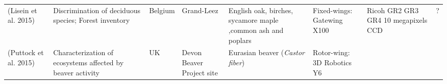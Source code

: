 \documentclass[]{interact}
\theoremstyle{plain}%
\theoremstyle{definition}
\theoremstyle{remark}
\begin{document}
\begin{longtable}[]{@{}llllllll@{}}
\begin{minipage}[t]{0.11\columnwidth}
(Lisein et al. 2015)\strut
\end{minipage} & \begin{minipage}[t]{0.18\columnwidth}\raggedright\strut
Discrimination of deciduous species; Forest inventory\strut
\end{minipage} & \begin{minipage}[t]{0.03\columnwidth}\raggedright\strut
Belgium\strut
\end{minipage} & \begin{minipage}[t]{0.14\columnwidth}\raggedright\strut
Grand-Leez\strut
\end{minipage} & \begin{minipage}[t]{0.10\columnwidth}\raggedright\strut
English oak, birches, sycamore maple ,common ash and poplars\strut
\end{minipage} & \begin{minipage}[t]{0.09\columnwidth}\raggedright\strut
Fixed-wings: Gatewing X100\strut
\end{minipage} & \begin{minipage}[t]{0.11\columnwidth}\raggedright\strut
Ricoh GR2 GR3 GR4 10 megapixels CCD\strut
\end{minipage} & \begin{minipage}[t]{0.01\columnwidth}\raggedright\strut
?\strut
\end{minipage}\tabularnewline
\begin{minipage}[t]{0.11\columnwidth}\raggedright\strut
(Puttock et al. 2015)\strut
\end{minipage} & \begin{minipage}[t]{0.18\columnwidth}\raggedright\strut
Characterization of ecosystems affected by beaver activity\strut
\end{minipage} & \begin{minipage}[t]{0.03\columnwidth}\raggedright\strut
UK\strut
\end{minipage} & \begin{minipage}[t]{0.14\columnwidth}\raggedright\strut
Devon Beaver Project site\strut
\end{minipage} & \begin{minipage}[t]{0.10\columnwidth}\raggedright\strut
Eurasian beaver (\emph{Castor fiber})\strut
\end{minipage} & \begin{minipage}[t]{0.09\columnwidth}\raggedright\strut
Rotor-wing: 3D Robotics Y6\strut
\end{minipage} & \begin{minipage}[t]{0.11\columnwidth}\raggedright\strut

\end{minipage}
\end{longtable}
\end{document}
